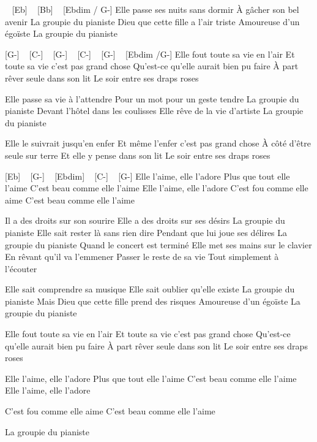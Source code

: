 
\begin{guitar}
[G-] ~ [Eb] ~ [Bb] ~ [Ebdim / G-]
	 Elle passe ses nuits sans dormir
À gâcher son bel avenir
La groupie du pianiste
Dieu que cette fille a l'air triste
Amoureuse d'un égoïste
La groupie du pianiste

[G-] ~ [C-] ~ [G-] ~ [C-] ~ [G-] ~ [Ebdim /G-]
Elle fout toute sa vie en l'air
Et toute sa vie c'est pas grand chose
Qu'est-ce qu'elle aurait bien pu faire
À part rêver seule dans son lit
Le soir entre ses draps roses

Elle passe sa vie à l'attendre
Pour un mot pour un geste tendre
La groupie du pianiste
Devant l'hôtel dans les coulisses
Elle rêve de la vie d'artiste
La groupie du pianiste

Elle le suivrait jusqu'en enfer
Et même l'enfer c'est pas grand chose
À côté d'être seule sur terre
Et elle y pense dans son lit
Le soir entre ses draps roses

[Eb] ~ [G-] ~ [Ebdim] ~ [C-] ~ [G-]
Elle l'aime, elle l'adore
Plus que tout elle l'aime
C'est beau comme elle l'aime
Elle l'aime, elle l'adore
C'est fou comme elle aime
C'est beau comme elle l'aime

Il a des droits sur son sourire
Elle a des droits sur ses désirs
La groupie du pianiste
Elle sait rester là sans rien dire
Pendant que lui joue ses délires
La groupie du pianiste
Quand le concert est terminé
Elle met ses mains sur le clavier
En rêvant qu'il va l'emmener
Passer le reste de sa vie
Tout simplement à l'écouter


Elle sait comprendre sa musique
Elle sait oublier qu'elle existe
La groupie du pianiste
Mais Dieu que cette fille prend des risques
Amoureuse d'un égoïste
La groupie du pianiste

Elle fout toute sa vie en l'air
Et toute sa vie c'est pas grand chose
Qu'est-ce qu'elle aurait bien pu faire
À part rêver seule dans son lit
Le soir entre ses draps roses

Elle l'aime, elle l'adore
Plus que tout elle l'aime
C'est beau comme elle l'aime
Elle l'aime, elle l'adore

C'est fou comme elle aime
C'est beau comme elle l'aime

La groupie du pianiste
\end{guitar}